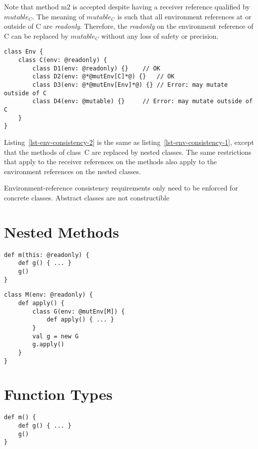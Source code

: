 Note that method {\cd m2} is accepted despite having a receiver reference
qualified by \mbox{$mutable_C$}. The meaning of \mbox{$mutable_C$} is
such that all environment references at or outside of {\cd C} are {\em readonly}.
Therefore, the {\em readonly} on the environment reference of {\cd C}
can be replaced by \mbox{$mutable_C$} without any loss of safety or precision.

\begin{lstlisting}[caption={Environment Reference Consistency (2)},float={htp},label={lst-env-consistency-2}]
class Env {
	class C(env: @readonly) {
		class D1(env: @readonly) {}    // OK
		class D2(env: @*@mutEnv[C]*@) {}   // OK
		class D3(env: @*@mutEnv[Env]*@) {} // Error: may mutate outside of C
		class D4(env: @mutable) {}     // Error: may mutate outside of C
	}
}
\end{lstlisting}

Listing~\ref{lst-env-consistency-2} is the same as listing~\ref{lst-env-consistency-1},
except that the methods of class~{\cd C} are replaced by nested classes.
The same restrictions that apply to the receiver references on the methods
also apply to the environment references on the nested classes.

Environment-reference consistency requirements only need to be enforced
for concrete classes. Abstract classes are not constructible


\section{Nested Methods} \label{sec-nested-methods}

\begin{lstlisting}[caption={},float={htp},label={lst-}]
def m(this: @readonly) {
	def g() { ... }
	g()
}
\end{lstlisting}

\begin{lstlisting}[caption={},float={htp},label={lst-}]
class M(env: @readonly) {
	def apply() {
		class G(env: @mutEnv[M]) {
			def apply() { ... }
		}
		val g = new G
		g.apply()
	}
}
\end{lstlisting}

\section{Function Types} \label{sec-function-types}

\begin{lstlisting}[caption={},float={htp},label={lst-}]
def m() {
	def g() { ... }
	g()
}
\end{lstlisting}

